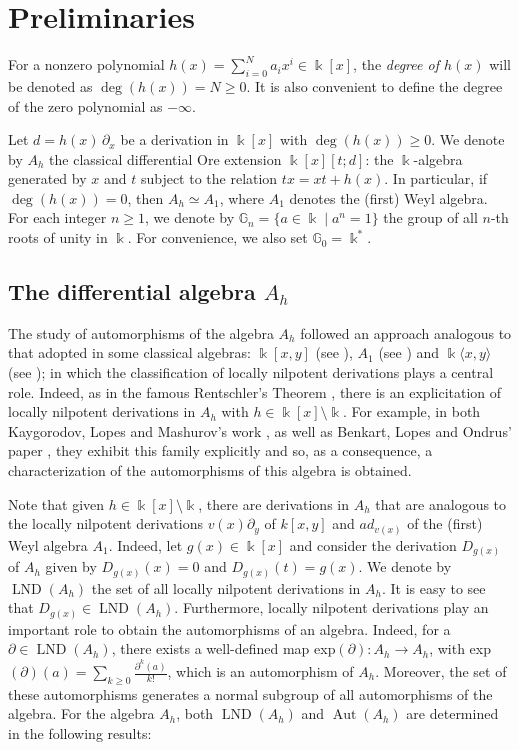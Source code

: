 \documentclass{article}
\numberwithin{equation}{section}\theoremstyle{plain}
\DeclareMathOperator{\Aut}{Aut}
\DeclareMathOperator{\LND}{LND}
\begin{document}
\section{Preliminaries}\label{section2}

For a nonzero polynomial $h(x) = \sum_{i=0}^N a_i x^i \in \Bbbk[x]$, the \emph{degree of $h(x)$} will be denoted as $\deg(h(x))=N \geq 0$.
It is also convenient to define the degree of the zero polynomial as $-\infty$.

Let $d=h(x) \, \partial_x$ be a derivation in $\Bbbk[x]$ with $\deg(h(x)) \geq 0$.
We denote by $A_h$ the classical differential Ore extension $\Bbbk[x] [t;d]$: the $\Bbbk$-algebra generated by $x$ and $t$ subject to the relation $tx = xt+h(x)$.
In particular, if $\deg(h(x))=0$, then $A_h \simeq A_1$, where $A_1$ denotes the (first) Weyl algebra. For each integer $n\geq 1$, we denote by $\mathbb{G}_n=\{a\in\Bbbk \mid a^n=1\}$ the group of all $n$-th roots of unity in $\Bbbk$. For convenience, we also set $\mathbb{G}_0=\Bbbk^\ast.$


\subsection{The differential algebra $A_h$}
The study of automorphisms of the algebra $A_h$ followed an approach analogous to that adopted in some classical algebras: $\Bbbk[x,y]$ (see \cite{Re1968}), $A_1$ (see \cite{Dixmier}) and $\Bbbk\langle x, y \rangle$ (see \cite{SC20}); in which the classification of locally nilpotent derivations plays a central role. Indeed, as in the famous Rentschler's Theorem \cite{Re1968}, there is an explicitation of locally nilpotent derivations in $A_h$ with $h\in \Bbbk[x]\setminus\Bbbk$.
For example, in both Kaygorodov, Lopes and Mashurov's work \cite{ISF2021}, as well as Benkart, Lopes and Ondrus' paper \cite{BLO2015}, they exhibit this family explicitly and so, as a consequence, a characterization of the automorphisms of this algebra is obtained.

Note that given $h \in \Bbbk[x]\setminus\Bbbk$, there are derivations in $A_h$ that are analogous to the locally nilpotent derivations $v(x)\partial_y$ of $k[x,y]$ and $ad_{v(x)}$ of the (first) Weyl algebra $A_1$.
Indeed, let $g(x) \in \Bbbk[x]$ and consider the derivation $D_{g(x)}$ of $A_h$ given by $D_{g(x)}(x)=0$ and $D_{g(x)}(t)=g(x)$.
We denote by $\LND(A_h)$ the set of all locally nilpotent derivations in $A_h$. 
It is easy to see that $D_{g(x)} \in \LND(A_h)$. 
Furthermore, locally nilpotent derivations play an important role to obtain the automorphisms of an algebra.
Indeed, for a $\partial \in \LND(A_h)$, there exists a well-defined map exp$(\partial): A_h \to A_h$, with exp$(\partial)(a)=\sum_{k\geq 0} \frac{\partial^k(a)}{k!}$, which is an automorphism of $A_h$.
Moreover, the set of these automorphisms generates a normal subgroup of all automorphisms of the algebra. 
For the algebra $A_h$, both $\LND(A_h)$ and $\Aut(A_h)$ are determined in the following results:
\end{document}
